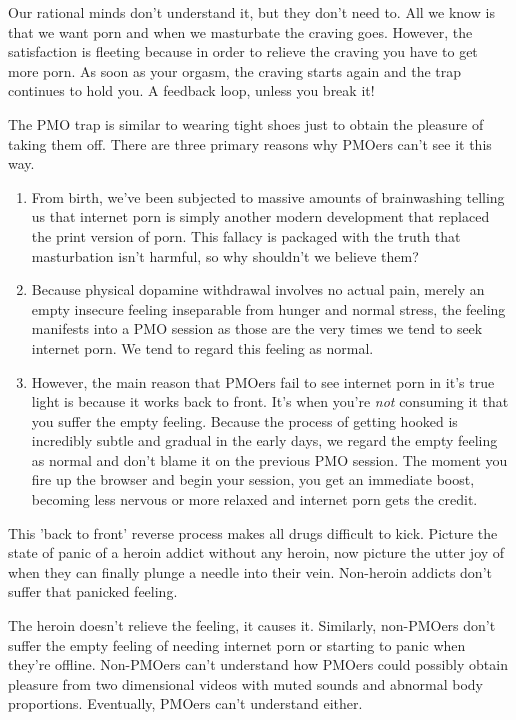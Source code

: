 \documentclass[easypeasy.tex]{subfiles}
\begin{document}
Our rational minds don't understand it, but they don't need to. All we know is that we want porn and when we masturbate the craving goes. However, the satisfaction is fleeting because in order to relieve the craving you have to get more porn. As soon as your orgasm, the craving starts again and the trap continues to hold you. A feedback loop, unless you break it!

The PMO trap is similar to wearing tight shoes just to obtain the pleasure of taking them off. There are three primary reasons why PMOers can't see it this way.

\begin{enumerate}
  \item From birth, we've been subjected to massive amounts of brainwashing telling us that internet porn is simply another modern development that replaced the print version of porn. This fallacy is packaged with the truth that masturbation isn't harmful, so why shouldn't we believe them?

  \item Because physical dopamine withdrawal involves no actual pain, merely an empty insecure feeling inseparable from hunger and normal stress, the feeling manifests into a PMO session as those are the very times we tend to seek internet porn. We tend to regard this feeling as normal.

  \item However, the main reason that PMOers fail to see internet porn in it's true light is because it works back to front. It's when you're \textit{not} consuming it that you suffer the empty feeling. Because the process of getting hooked is incredibly subtle and gradual in the early days, we regard the empty feeling as normal and don't blame it on the previous PMO session. The moment you fire up the browser and begin your session, you get an immediate boost, becoming less nervous or more relaxed and internet porn gets the credit.
  \end{enumerate}

This 'back to front' reverse process makes all drugs difficult to kick. Picture the state of panic of a heroin addict without any heroin, now picture the utter joy of when they can finally plunge a needle into their vein. Non-heroin addicts don't suffer that panicked feeling.

The heroin doesn't relieve the feeling, it causes it. Similarly, non-PMOers don't suffer the empty feeling of needing internet porn or starting to panic when they're offline. Non-PMOers can't understand how PMOers could possibly obtain pleasure from two dimensional videos with muted sounds and abnormal body proportions. Eventually, PMOers can't understand either.
\end{document}
